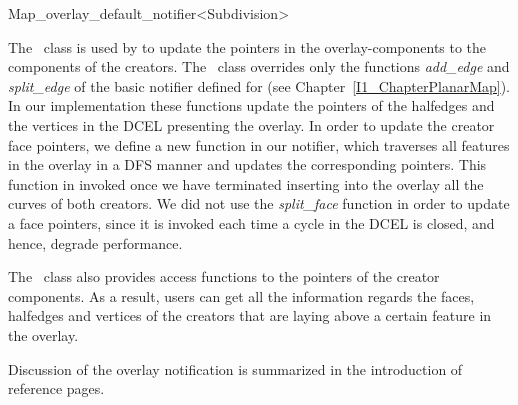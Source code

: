 
\ccRefPageBegin


\renewcommand{\ccRefPageBegin}{\begin{ccAdvanced}}
\renewcommand{\ccRefPageEnd}{\end{ccAdvanced}}

\begin{ccRefClass}{Map_overlay_default_notifier<Subdivision>}
\label{OVL_sec:notifier}

The \ccRefName\ class is used by  to update
the pointers in the overlay-components to the components of the creators.
The \ccRefName\ class overrides only the functions {\it add\_edge} 
and {\it split\_edge} of the basic notifier defined for 
(see Chapter~\ref{I1_ChapterPlanarMap}). In our implementation these functions update 
the pointers of the halfedges and the vertices in the DCEL presenting the overlay.
In order to update the creator face pointers, we define a new function in our notifier, 
which traverses all features in the overlay in a DFS manner and updates the 
corresponding pointers. This function in invoked once we have terminated 
inserting into the overlay all the curves of both creators.
We did not use the {\it split\_face} function in order to update a face pointers, 
since it is invoked each time a cycle in the DCEL is closed, and hence, degrade performance.

The \ccRefName\ class also provides access functions to the pointers of the 
creator components. As a result, users can get all the information regards the 
faces, halfedges and vertices of the creators that are laying above a certain feature 
in the overlay.


\ccIsModel

\ccInheritsFrom

\ccSeeAlso
   Discussion of the overlay notification is summarized in the introduction
   of  reference pages.

\end{ccRefClass}
\renewcommand{\ccRefPageBegin}{}
\renewcommand{\ccRefPageEnd}{}


\ccRefPageEnd
